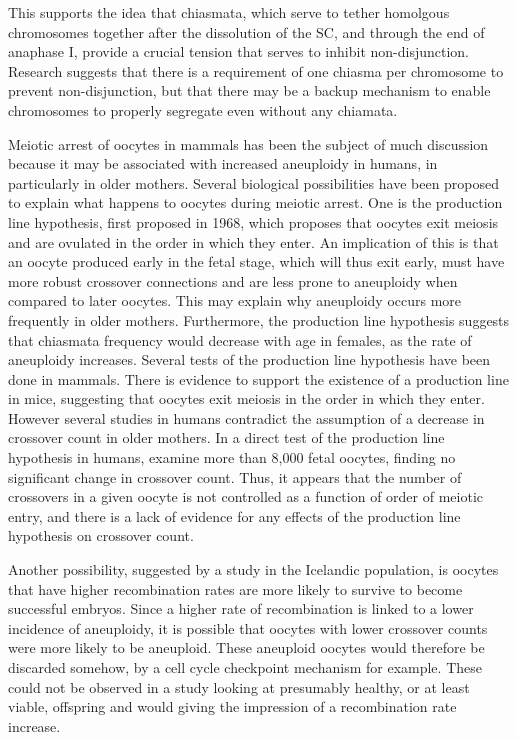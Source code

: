 This supports the idea that chiasmata, which serve to tether homolgous chromosomes together after the dissolution of the SC, and through the end of anaphase I, provide a crucial tension that serves to inhibit non-disjunction.
Research suggests that there is a requirement of one chiasma per chromosome to prevent non-disjunction, but that there may be a backup mechanism to enable chromosomes to properly segregate even without any chiamata\cite{Fledel-Alon2009}.

Meiotic arrest of oocytes in mammals has been the subject of much discussion because it may be associated with increased aneuploidy in humans, in particularly in older mothers.  
Several biological possibilities have been proposed to explain what happens to oocytes during meiotic arrest.
One is the production line hypothesis, first proposed in 1968\cite{Henderson1968}, which proposes that oocytes exit meiosis and are ovulated in the order in which they enter.
An implication of this is that an oocyte produced early in the fetal stage, which will thus exit early, must have more robust crossover connections and are less prone to aneuploidy when compared to later oocytes.
This may explain why aneuploidy occurs more frequently in older mothers.
Furthermore, the production line hypothesis suggests that chiasmata frequency would decrease with age in females, as the rate of aneuploidy increases.
Several tests of the production line hypothesis have been done in mammals.
There is evidence to support the existence of a production line in mice\cite{Polani1991}, suggesting that oocytes exit meiosis in the order in which they enter.
However several studies in humans contradict the assumption of a decrease in crossover count in older mothers\cite{Kong2004,Martin2015}.
In a direct test of the production line hypothesis in humans, \citet{Rowsey2014} examine more than 8,000 fetal oocytes, finding no significant change in crossover count.
Thus, it appears that the number of crossovers in a given oocyte is not controlled as a function of order of meiotic entry, and there is a lack of evidence for any effects of the production line hypothesis on crossover count.

Another possibility, suggested by a study in the Icelandic population\cite{Kong2004}, is oocytes that have higher recombination rates are more likely to survive to become successful embryos.
Since a higher rate of recombination is linked to a lower incidence of aneuploidy, it is possible that oocytes with lower crossover counts were more likely to be aneuploid.
These aneuploid oocytes would therefore be discarded somehow, by a cell cycle checkpoint mechanism for example.
These could not be observed in a study looking at presumably healthy, or at least viable, offspring and would giving the impression of a recombination rate increase.

